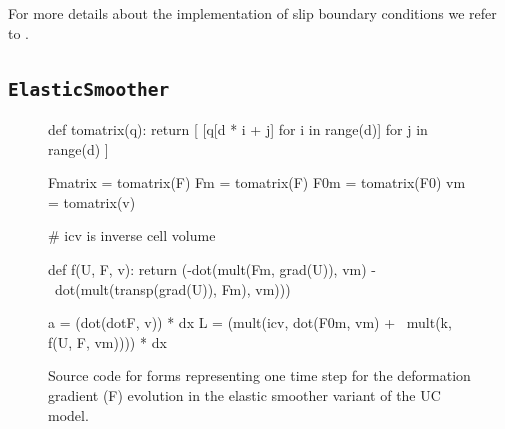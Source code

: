For more details about the implementation of slip boundary conditions
we refer to \citet{Nazarov2009}.

\subsection{\tt ElasticSmoother}


\begin{figure}[!h]
{\small
\begin{python}
def tomatrix(q):
    return [ [q[d * i + j] for i in range(d)] for j in range(d) ]

Fmatrix = tomatrix(F)
Fm = tomatrix(F)
F0m = tomatrix(F0)
vm = tomatrix(v)

# icv is inverse cell volume

def f(U, F, v):
    return (-dot(mult(Fm, grad(U)), vm) - \
     dot(mult(transp(grad(U)), Fm), vm)))

a = (dot(dotF, v)) * dx
L = (mult(icv, dot(F0m, vm) + \
  mult(k, f(U, F, vm)))) * dx
\end{python}
}
\caption{Source code for forms representing one time step for the deformation gradient (F) evolution in the elastic smoother variant of the UC model. }
\label{code:FFC_ElasticSmoother}
\end{figure}


